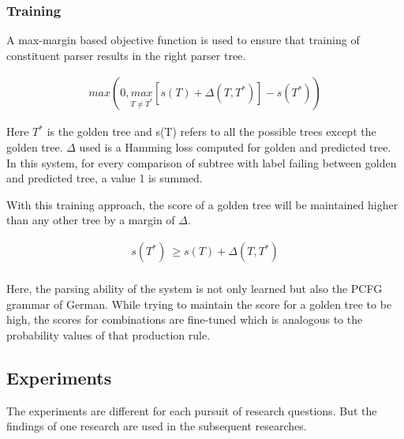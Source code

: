 \documentclass[a4paper, 11pt]{article}
\begin{document}
\subsubsection{Training}

A max-margin based objective function is used to ensure that training of constituent parser results in the right parser tree.

\begin{align*}
max\left(0, \underset{T\neq{T^*}}{max}\left[s(T) + \Delta(T,T^*)\right] - s(T^*)\right)
\end{align*}

Here $T^*$ is the golden tree and s(T) refers to all the possible trees except the golden tree. $\Delta$ used is a Hamming loss computed for golden and predicted tree. In this system, for every comparison of subtree with label failing between golden and predicted tree, a value 1 is summed.

With this training approach, the score of a golden tree will be maintained higher than any other tree by a margin of $\Delta$.  

\begin{align*}
s(T^*)\ \geq s(T) + \Delta (T,T^*) \\
\end{align*}

Here, the parsing ability of the system is not only learned but also the PCFG grammar of German. While trying to maintain the score for a golden tree to be high, the scores for combinations are fine-tuned which is analogous to the probability values of that production rule.

\subsection{Experiments}

The experiments are different for each pursuit of research questions. But the findings of one research are used in the subsequent researches. 
\end{document}
